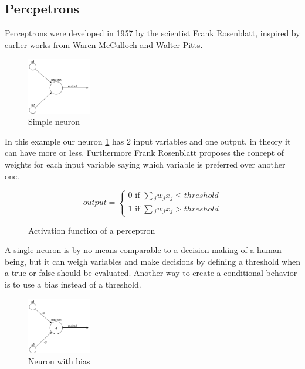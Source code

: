\subsection{Percpetrons}
Perceptrons were developed in 1957 by the scientist Frank Rosenblatt, inspired by earlier works from Waren McCulloch and Walter
Pitts.\cite{neuralnetworksanddeeplearning}
\vspace{0.25cm}
\begin{figure}[hbt!]
    \caption{Simple neuron}
    \begin{center}
        \includegraphics[width=0.25\textwidth]{images/neurons/simple_neuron.png}
    \end{center}
    \label{fig:simple-neuron}
\end{figure}
\vspace{0.25cm}
In this example our neuron \ref{fig:simple-neuron} has 2 input variables and one output, in theory it can have more or less. Furthermore Frank Rosenblatt proposes
the concept of weights for each input variable saying which variable is preferred over another one.
\vspace{0.25cm}
\begin{figure}[hbt!]
    \caption{Activation function of a perceptron}
    \begin{equation*}
        output=
        \begin{cases}
            0 \text{ if } \sum{_j}{w_jx_j \le threshold}\\
            1 \text{ if } \sum{_j}{w_jx_j > threshold}
        \end{cases}
    \end{equation*}
\end{figure}
\newpage \noindent
A single neuron is by no means comparable to a decision making of a human being, but it can weigh variables and make decisions
by defining a threshold when a true or false should be evaluated. Another way to create a conditional behavior is to use a bias
instead of a threshold.
\vspace{0.25cm}
\begin{figure}[hbt!]
    \caption{Neuron with bias}
    \begin{center}
        \includegraphics[width=0.25\textwidth]{images/neurons/simple_neuron_bias.png}
    \end{center} 
\end{figure}
